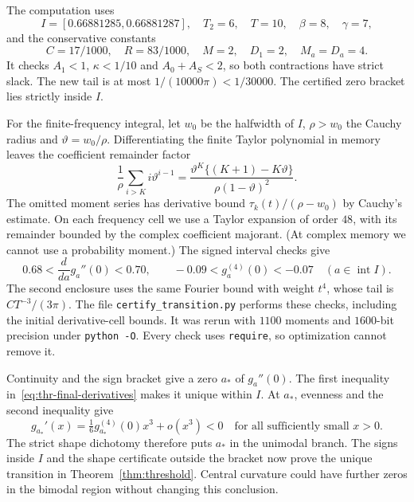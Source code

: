 The computation uses
\[
 I=[0.66881285,0.66881287],\quad T_2=6,\quad T=10,
 \quad\beta=8,\quad\gamma=7,
\]
and the conservative constants
\[
 C=17/1000,\quad R=83/1000,\quad M=2,
 \quad D_1=2,\quad M_a=D_a=4.
\]
It checks $A_1<1$, $\kappa<1/10$ and $A_0+A_S<2$, so both
contractions have strict slack. The new tail is at most
$1/(10000\pi)<1/30000$.
The certified zero bracket lies strictly inside $I$.

For the finite-frequency integral, let $w_0$ be the halfwidth of $I$,
$\rho>w_0$ the Cauchy radius and $\vartheta=w_0/\rho$.
Differentiating the finite Taylor polynomial in memory leaves the
coefficient remainder factor
\[
 \frac1\rho\sum_{i>K}i \vartheta^{i-1}
 =\frac{\vartheta^K\{(K+1)-K\vartheta\}}{\rho(1-\vartheta)^2}.
\]
The omitted moment series has derivative bound
$\tau_k(t)/(\rho-w_0)$ by Cauchy's estimate.
On each frequency cell we use a Taylor expansion of order $48$, with its remainder bounded by the complex coefficient majorant. (At complex memory we cannot use a probability moment.)
The signed interval checks give
\begin{equation}\label{eq:thr-final-derivatives}
 0.68<\frac{d}{da}g_a''(0)<0.70,\qquad
 -0.09<g_a^{(4)}(0)<-0.07
 \quad(a\in\operatorname{int}I).
\end{equation}
The second enclosure uses the same Fourier bound with weight $t^4$, whose tail is $CT^{-3}/(3\pi)$.
The file \texttt{certify\_transition.py} performs these checks, including
the initial derivative-cell bounds. It was rerun with $1100$ moments
and $1600$-bit precision under \texttt{python -O}. Every check uses
\texttt{require}, so optimization cannot remove it.

Continuity and the sign bracket give a zero $a_*$ of $g_a''(0)$.
The first inequality in~\eqref{eq:thr-final-derivatives} makes it unique
within $I$. At $a_*$, evenness
and the second inequality give
\[
 g_{a_*}'(x)=\tfrac16g_{a_*}^{(4)}(0)x^3+o(x^3)<0
 \quad\text{for all sufficiently small }x>0.
\]
The strict shape dichotomy therefore puts $a_*$ in the unimodal branch.
The signs inside $I$ and the shape certificate outside the bracket now prove the unique transition in Theorem~\ref{thm:threshold}. Central curvature could have further zeros in the bimodal region without changing this conclusion.

